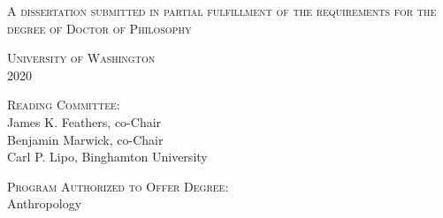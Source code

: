 

\begin{titlingpage}
\begin{center}\leavevmode

    \normalfont
    \vfill

    {\Large \textsc{\thesisTitle}\par
    \hrulefill\par}
    
    \vfill
    
    {\Large \thesisAuthor\par}%

	\vfill
    
    {\large \textsc{A dissertation
submitted in partial fulfillment of the
requirements for the degree of Doctor of Philosophy\\[0.5em]}}
    
\vfill

    
    {\large \textsc{University of Washington\\ 2020}}

	\vfill
	
	{\large \textsc{Reading Committee:}\\
	James K. Feathers, co-Chair\\
	Benjamin Marwick, co-Chair\\ 
	Carl P. Lipo, Binghamton University\\}
	
	\vfill
	
	{\large \textsc{Program Authorized to Offer Degree:}\\
	Anthropology\\}
	
	

\end{center}%
\end{titlingpage}
